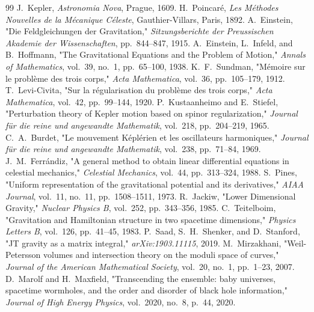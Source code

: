 \documentclass[11pt,a4paper,reqno]{article}
\theoremstyle{plain}
\theoremstyle{definition}
\theoremstyle{remark}
\numberwithin{equation}{section}
\begin{document}
\begin{thebibliography}{99}
 J.~Kepler, \emph{Astronomia Nova}, Prague, 1609.
 H.~Poincar\'{e}, \emph{Les M\'{e}thodes Nouvelles de la M\'{e}canique C\'{e}leste}, Gauthier-Villars, Paris, 1892.
 A.~Einstein, "Die Feldgleichungen der Gravitation," \emph{Sitzungsberichte der Preussischen Akademie der Wissenschaften}, pp.~844--847, 1915.
 A.~Einstein, L.~Infeld, and B.~Hoffmann, "The Gravitational Equations and the Problem of Motion," \emph{Annals of Mathematics}, vol.~39, no.~1, pp.~65--100, 1938.
 K.~F.~Sundman, "M\'{e}moire sur le problème des trois corps," \emph{Acta Mathematica}, vol.~36, pp.~105--179, 1912.
 T.~Levi-Civita, "Sur la r\'{e}gularisation du problème des trois corps," \emph{Acta Mathematica}, vol.~42, pp.~99--144, 1920.
 P.~Kustaanheimo and E.~Stiefel, "Perturbation theory of Kepler motion based on spinor regularization," \emph{Journal f\"{u}r die reine und angewandte Mathematik}, vol.~218, pp.~204--219, 1965.
 C.~A.~Burdet, "Le mouvement K\'{e}pl\'{e}rien et les oscillateurs harmoniques," \emph{Journal f\"{u}r die reine und angewandte Mathematik}, vol.~238, pp.~71--84, 1969.
 J.~M.~Ferr\'{a}ndiz, "A general method to obtain linear differential equations in celestial mechanics," \emph{Celestial Mechanics}, vol.~44, pp.~313--324, 1988.
 S.~Pines, "Uniform representation of the gravitational potential and its derivatives," \emph{AIAA Journal}, vol.~11, no.~11, pp.~1508--1511, 1973.
 R.~Jackiw, "Lower Dimensional Gravity," \emph{Nuclear Physics B}, vol.~252, pp.~343--356, 1985.
 C.~Teitelboim, "Gravitation and Hamiltonian structure in two spacetime dimensions," \emph{Physics Letters B}, vol.~126, pp.~41--45, 1983.
 P.~Saad, S.~H.~Shenker, and D.~Stanford, "JT gravity as a matrix integral," \emph{arXiv:1903.11115}, 2019.
 M.~Mirzakhani, "Weil-Petersson volumes and intersection theory on the moduli space of curves," \emph{Journal of the American Mathematical Society}, vol.~20, no.~1, pp.~1--23, 2007.
 D.~Marolf and H.~Maxfield, "Transcending the ensemble: baby universes, spacetime wormholes, and the order and disorder of black hole information," \emph{Journal of High Energy Physics}, vol.~2020, no.~8, p.~44, 2020.

\end{thebibliography}
\end{document}
